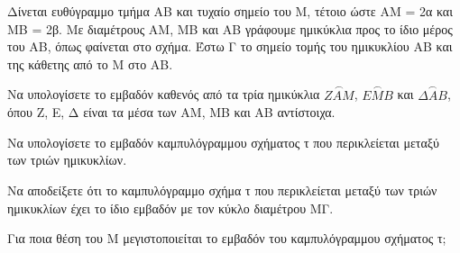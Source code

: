 \begin{figure}
\end{figure}
Δίνεται ευθύγραμμο τμήμα ΑΒ και τυχαίο σημείο του Μ, τέτοιο ώστε ΑΜ = 2α και ΜΒ = 2β. Με διαμέτρους ΑΜ, ΜΒ και ΑΒ γράφουμε ημικύκλια προς το ίδιο μέρος του ΑΒ, όπως φαίνεται στο σχήμα. Έστω Γ το σημείο τομής του ημικυκλίου ΑΒ και της κάθετης από το Μ στο ΑΒ.
\begin{alist}
\item Να υπολογίσετε το εμβαδόν καθενός από τα τρία ημικύκλια $\overset{\frown}{ZAM}$, $\overset{\frown}{EMB}$ και $\overset{\frown}{\Delta AB}$, όπου Ζ, Ε, Δ είναι τα μέσα των AM, MB και AB αντίστοιχα. 
\item Να υπολογίσετε το εμβαδόν καμπυλόγραμμου σχήματος τ που περικλείεται μεταξύ των τριών ημικυκλίων. 
\item Να αποδείξετε ότι το καμπυλόγραμμο σχήμα τ που περικλείεται μεταξύ των τριών ημικυκλίων έχει το ίδιο εμβαδόν με τον κύκλο διαμέτρου ΜΓ. 
\item Για ποια θέση του Μ μεγιστοποιείται το εμβαδόν του καμπυλόγραμμου σχήματος τ; 
\end{alist}